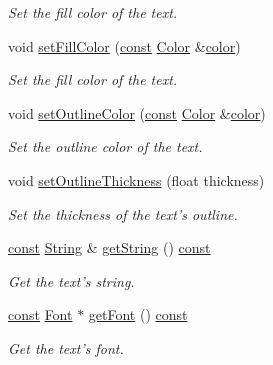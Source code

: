 \begin{DoxyCompactItemize}
\begin{DoxyCompactList}\small\item\em Set the fill color of the text. \end{DoxyCompactList}\item 
void \hyperlink{classsf_1_1_text_ab7bb3babac5a6da1802b2c3e1a3e6dcc}{set\-Fill\-Color} (\hyperlink{term__entry_8h_a57bd63ce7f9a353488880e3de6692d5a}{const} \hyperlink{classsf_1_1_color}{Color} \&\hyperlink{_entity_8cpp_a864889304a90873adb9c6e289a54bcf4}{color})
\begin{DoxyCompactList}\small\item\em Set the fill color of the text. \end{DoxyCompactList}\item 
void \hyperlink{classsf_1_1_text_aa19ec69c3b894e963602a6804ca68fe4}{set\-Outline\-Color} (\hyperlink{term__entry_8h_a57bd63ce7f9a353488880e3de6692d5a}{const} \hyperlink{classsf_1_1_color}{Color} \&\hyperlink{_entity_8cpp_a864889304a90873adb9c6e289a54bcf4}{color})
\begin{DoxyCompactList}\small\item\em Set the outline color of the text. \end{DoxyCompactList}\item 
void \hyperlink{classsf_1_1_text_ab0e6be3b40124557bf53737fe6a6ce77}{set\-Outline\-Thickness} (float thickness)
\begin{DoxyCompactList}\small\item\em Set the thickness of the text's outline. \end{DoxyCompactList}\item 
\hyperlink{term__entry_8h_a57bd63ce7f9a353488880e3de6692d5a}{const} \hyperlink{classsf_1_1_string}{String} \& \hyperlink{classsf_1_1_text_a14d580e8afdd43c210429505310ecc95}{get\-String} () \hyperlink{term__entry_8h_a57bd63ce7f9a353488880e3de6692d5a}{const} 
\begin{DoxyCompactList}\small\item\em Get the text's string. \end{DoxyCompactList}\item 
\hyperlink{term__entry_8h_a57bd63ce7f9a353488880e3de6692d5a}{const} \hyperlink{classsf_1_1_font}{Font} $\ast$ \hyperlink{classsf_1_1_text_ab831de193307ab591b34221440613aa1}{get\-Font} () \hyperlink{term__entry_8h_a57bd63ce7f9a353488880e3de6692d5a}{const} 
\begin{DoxyCompactList}\small\item\em Get the text's font. \end{DoxyCompactList}\item 

\end{DoxyCompactItemize}
